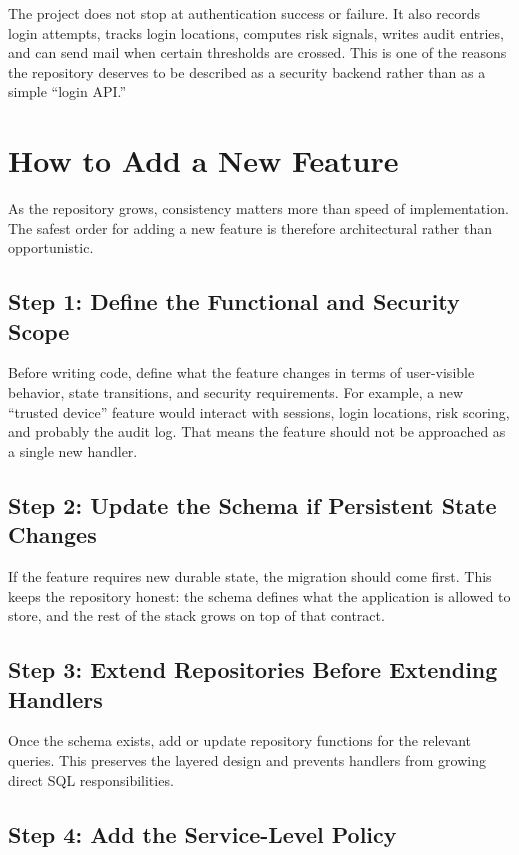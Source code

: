 \documentclass[11pt,a4paper]{article}
\begin{document}
The project does not stop at authentication success or failure. It also records login attempts, tracks login locations, computes risk signals, writes audit entries, and can send mail when certain thresholds are crossed. This is one of the reasons the repository deserves to be described as a security backend rather than as a simple ``login API.''

\section{How to Add a New Feature}

As the repository grows, consistency matters more than speed of implementation. The safest order for adding a new feature is therefore architectural rather than opportunistic.

\subsection{Step 1: Define the Functional and Security Scope}

Before writing code, define what the feature changes in terms of user-visible behavior, state transitions, and security requirements. For example, a new ``trusted device'' feature would interact with sessions, login locations, risk scoring, and probably the audit log. That means the feature should not be approached as a single new handler.

\subsection{Step 2: Update the Schema if Persistent State Changes}

If the feature requires new durable state, the migration should come first. This keeps the repository honest: the schema defines what the application is allowed to store, and the rest of the stack grows on top of that contract.

\subsection{Step 3: Extend Repositories Before Extending Handlers}

Once the schema exists, add or update repository functions for the relevant queries. This preserves the layered design and prevents handlers from growing direct SQL responsibilities.

\subsection{Step 4: Add the Service-Level Policy}
\end{document}
